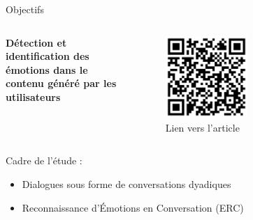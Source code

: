 \documentclass[11pt,aspectratio=169]{beamer}
\begin{document}
\begin{frame}{Objectifs}
    \vspace{-10pt}
    \begin{columns}
        \begin{column}[b]{0.70\linewidth}
            \begin{center}
                \textcolor{roose}{\bf Détection et identification des émotions dans le contenu généré par les utilisateurs}
            \end{center}
        \end{column}
        \begin{column}[c]{0.2\linewidth}
            \begin{figure}
                \centering
                \captionsetup{labelformat=empty}
                \includegraphics[width=0.5\textwidth]{code-paper.png}
                \caption{\centering Lien vers l'article}
            \end{figure}
        \end{column}
    \end{columns}
    \vspace{-15pt}
    Cadre de l'étude :
    \begin{itemize}
        \item Dialogues sous forme de conversations dyadiques %
        \item Reconnaissance d'Émotions en Conversation (ERC) %
    \end{itemize}
    \vspace{8pt}
\end{frame}
\end{document}
